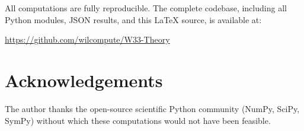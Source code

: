 \documentclass[12pt,a4paper]{article}
\begin{document}
All computations are fully reproducible. The complete codebase,
including all Python modules, JSON results, and this \LaTeX{} source,
is available at:
\begin{center}
  \url{https://github.com/wilcompute/W33-Theory}
\end{center}

\section*{Acknowledgements}

The author thanks the open-source scientific Python community
(NumPy, SciPy, SymPy) without which these computations would not
have been feasible.
\end{document}
